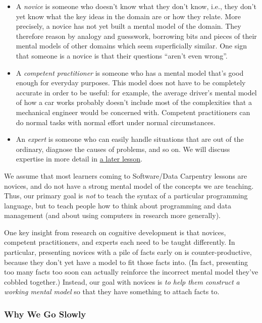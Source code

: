 \begin{itemize}
\itemsep1pt\parskip0pt
\item
  A \emph{novice} is someone who doesn't know what they don't know,
  i.e., they don't yet know what the key ideas in the domain are or how
  they relate. More precisely, a novice has not yet built a mental model
  of the domain. They therefore reason by analogy and guesswork,
  borrowing bits and pieces of their mental models of other domains
  which seem superficially similar. One sign that someone is a novice is
  that their questions ``aren't even wrong''.
\item
  A \emph{competent practitioner} is someone who has a mental model
  that's good enough for everyday purposes. This model does not have to
  be completely accurate in order to be useful: for example, the average
  driver's mental model of how a car works probably doesn't include most
  of the complexities that a mechanical engineer would be concerned
  with. Competent practitioners can do normal tasks with normal effort
  under normal circumstances.
\item
  An \emph{expert} is someone who can easily handle situations that are
  out of the ordinary, diagnose the causes of problems, and so on. We
  will discuss expertise in more detail in
  \href{\{\{\%20page.root\%20\}\}/08-memory/}{a later lesson}.
\end{itemize}

We assume that most learners coming to Software/Data Carpentry lessons
are novices, and do not have a strong mental model of the concepts we
are teaching. Thus, our primary goal is \emph{not} to teach the syntax
of a particular programming language, but to teach people how to think
about programming and data management (and about using computers in
research more generally).

One key insight from research on cognitive development is that novices,
competent practitioners, and experts each need to be taught differently.
In particular, presenting novices with a pile of facts early on is
counter-productive, because they don't yet have a model to fit those
facts into. (In fact, presenting too many facts too soon can actually
reinforce the incorrect mental model they've cobbled together.) Instead,
our goal with novices is \emph{to help them construct a working mental
model} so that they have something to attach facts to.

\subsubsection{Why We Go Slowly}\label{why-we-go-slowly}

